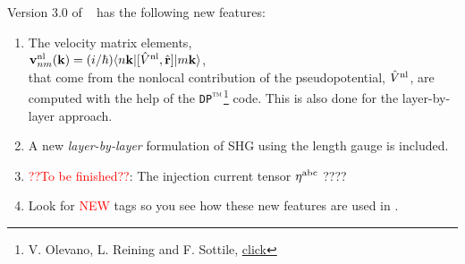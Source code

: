 \documentclass[12pt]{article}
\numberwithin{equation}{section}
\begin{document}
Version 3.0 of \tiniba~ has the following new features:
\begin{enumerate}
\item The velocity matrix elements,\\
$\mathbf{v}^{\mathrm{nl}}_{nm}(\mathbf{k})=(i/\hbar)\langle n\mathbf{k} |[\hat V^{\mathrm{nl}},\hat{\mathbf{r}}]| m\mathbf{k} \rangle$,\\   
 that come from the
nonlocal contribution of the
pseudopotential, $\hat V^{\mathrm{nl}}$, are computed with the help of the 
\verb=DP=$\tm$\footnote{V. Olevano, L. Reining
    and F. Sottile,
    \href{http:etsf.polytechnique.fr/Software/Ab_Initio}{click}}
  code. This is also done for the layer-by-layer approach.
\item A new {\it layer-by-layer} formulation of SHG using the length gauge
  is included. 
\item \textcolor{red}{??To be finished??}: The injection current tensor $\eta^{\mathrm{a}\mathrm{b}\mathrm{c}}$ ????
\item Look for \textcolor{red}{NEW} tags so you see how these new
  features are used in \tiniba.
\end{enumerate}
\end{document}

